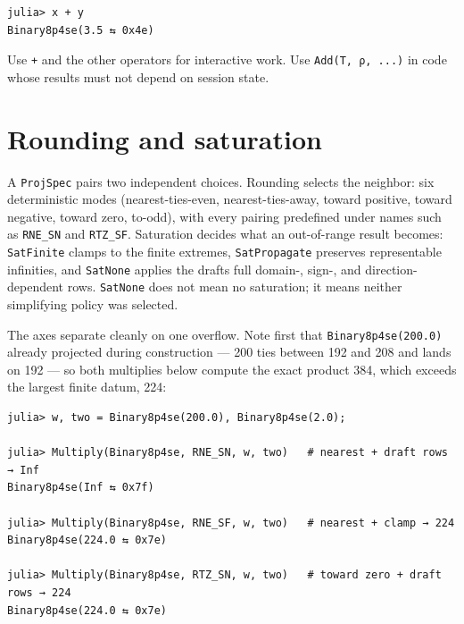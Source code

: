 \begin{verbatim}
julia> x + y
Binary8p4se(3.5 ⇆ 0x4e)
\end{verbatim}



Use \texttt{+} and the other operators for interactive work. Use \texttt{Add(T, ρ, ...)} in code whose results must not depend on session state.



\section{Rounding and saturation}



\label{4169779663468363235}{}


A \texttt{ProjSpec} pairs two independent choices. Rounding selects the neighbor: six deterministic modes (nearest-ties-even, nearest-ties-away, toward positive, toward negative, toward zero, to-odd), with every pairing predefined under names such as \texttt{RNE\_SN} and \texttt{RTZ\_SF}. Saturation decides what an out-of-range result becomes: \texttt{SatFinite} clamps to the finite extremes, \texttt{SatPropagate} preserves representable infinities, and \texttt{SatNone} applies the draft{\textquotesingle}s full domain-, sign-, and direction-dependent rows. \texttt{SatNone} does not mean {\textquotedbl}no saturation{\textquotedbl}; it means neither simplifying policy was selected.



The axes separate cleanly on one overflow. Note first that \texttt{Binary8p4se(200.0)} already projected during construction — 200 ties between 192 and 208 and lands on 192 — so both multiplies below compute the exact product 384, which exceeds the largest finite datum, 224:




\begin{verbatim}
julia> w, two = Binary8p4se(200.0), Binary8p4se(2.0);

julia> Multiply(Binary8p4se, RNE_SN, w, two)   # nearest + draft rows → Inf
Binary8p4se(Inf ⇆ 0x7f)

julia> Multiply(Binary8p4se, RNE_SF, w, two)   # nearest + clamp → 224
Binary8p4se(224.0 ⇆ 0x7e)

julia> Multiply(Binary8p4se, RTZ_SN, w, two)   # toward zero + draft rows → 224
Binary8p4se(224.0 ⇆ 0x7e)
\end{verbatim}



